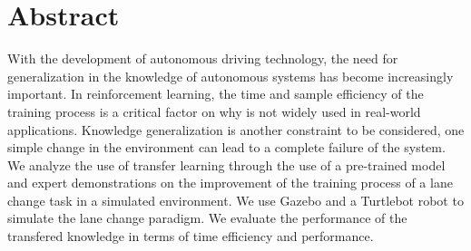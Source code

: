 
\chapter{Abstract}
With the development of autonomous driving technology, the need for generalization in the knowledge of autonomous systems has become increasingly important. In reinforcement learning, the time and sample efficiency of the training process is a critical factor on why is not widely used in real-world applications. Knowledge generalization is another constraint to be considered, one simple change in the environment can lead to a complete failure of the system. We analyze the use of transfer learning through the use of a pre-trained model and expert demonstrations on the improvement of the training process of a lane change task in a simulated environment. We use Gazebo and a Turtlebot robot to simulate the lane change paradigm. We evaluate the performance of the transfered knowledge in terms of time efficiency and performance.
\endinput
